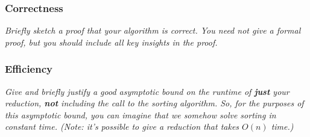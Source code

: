 \documentclass[11pt, oneside]{article}   	%
\theoremstyle{definition}
\theoremstyle{remark}
\begin{document}
\subsubsection{Correctness}
\textit{Briefly sketch a proof that your algorithm is correct. You need not give a formal proof, but you should include all key insights in the proof.}

%	

\subsubsection{Efficiency}
\textit{Give and briefly justify a good asymptotic bound on the runtime of \textbf{just} your reduction, \textbf{not} including the call to the sorting algorithm. So, for the purposes of this asymptotic bound, you can imagine that we somehow solve sorting in constant time. (Note: it's possible to give a reduction that takes $O(n)$ time.)}

%
%
\end{document}
